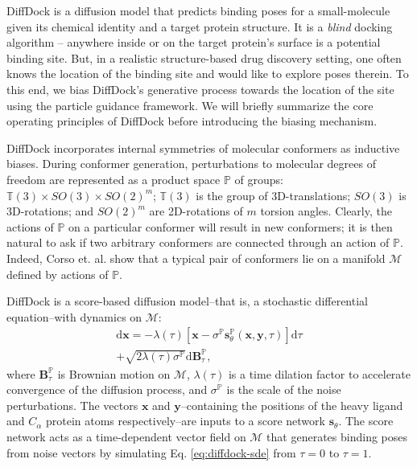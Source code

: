 \documentclass[%
 aip,
 amsmath,amssymb,
reprint,%
]{revtex4-1}
\begin{document}
DiffDock is a diffusion model that predicts binding poses for a small-molecule given its chemical identity and a target protein structure. It is a {\it blind} docking algorithm -- anywhere inside or on the target protein's surface is a potential binding site. But, in a realistic structure-based drug discovery setting, one often knows the location of the binding site and would like to explore poses therein. To this end, we bias DiffDock's generative process towards the location of the site using the particle guidance framework.\cite{corso2023particle} We will briefly summarize the core operating principles of DiffDock before introducing the biasing mechanism.




DiffDock incorporates internal symmetries of molecular conformers as inductive biases. During conformer generation, perturbations to molecular degrees of freedom are represented as a product space $\mathbb{P}$ of groups: $\mathbb{T}(3) \times SO(3) \times SO(2)^m$; $\mathbb{T}(3)$ is the group of 3D-translations; $SO(3)$ is 3D-rotations; and $SO(2)^m$ are 2D-rotations of $m$ torsion angles. Clearly, the actions of $\mathbb{P}$ on a particular conformer will result in new conformers; it is then natural to ask if two arbitrary conformers are connected through an action of $\mathbb{P}$. Indeed, Corso et. al. show that a typical pair of conformers lie on a manifold $\mathcal{M}$ defined by actions of $\mathbb{P}$.\cite{corso2022diffdock}


DiffDock is a score-based diffusion model\cite{song2020sgm}--that is, a stochastic differential equation--with dynamics on $\mathcal{M}$:
\begin{equation}
    \begin{aligned}
    \label{eq:diffdock-sde}
        \mathrm{d}\mathbf{x} = - \lambda(\tau) 
        \left[ \mathbf{x} - \sigma^{\mathbb{P}}\mathbf{s}^\mathbb{P}_\theta(\mathbf{x}, \mathbf{y}, \tau) \right]
        \mathrm{d}\tau \\+ \sqrt{2 \lambda(\tau) \sigma^{\mathbb{P}}}\mathrm{d}\mathbf{B}^{\mathbb{P}}_\tau,
    \end{aligned}
\end{equation}
where $\mathbf{B}_\tau^{\mathbb{P}}$ is Brownian motion on $\mathcal{M}$, $\lambda(\tau)$ is a time dilation factor to accelerate convergence of the diffusion process, and $\sigma^{\mathbb{P}}$ is the scale of the noise perturbations. The vectors $\mathbf{x}$ and $\mathbf{y}$--containing the positions of the heavy ligand and $C_\alpha$ protein atoms respectively--are inputs to a score network $\mathbf{s}_\theta$. The score network acts as a time-dependent vector field on $\mathcal{M}$ that generates binding poses from noise vectors by simulating Eq. \ref{eq:diffdock-sde} from $\tau = 0$ to $\tau = 1$.
\end{document}
